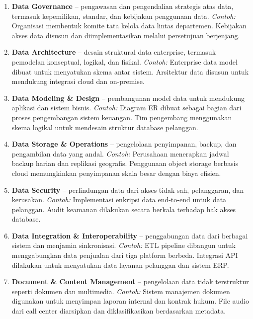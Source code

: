 \begin{enumerate}
	\item \textbf{Data Governance} – pengawasan dan pengendalian strategis atas data, termasuk kepemilikan, standar, dan kebijakan penggunaan data. \textit{Contoh:}  Organisasi membentuk komite tata kelola data lintas departemen. Kebijakan akses data disusun dan diimplementasikan melalui persetujuan berjenjang.
	
	\item \textbf{Data Architecture} – desain struktural data enterprise, termasuk pemodelan konseptual, logikal, dan fisikal. \textit{Contoh:}  Enterprise data model dibuat untuk menyatukan skema antar sistem. Arsitektur data disusun untuk mendukung integrasi cloud dan on-premise.
	
	\item \textbf{Data Modeling \& Design} – pembangunan model data untuk mendukung aplikasi dan sistem bisnis. \textit{Contoh:}  Diagram ER dibuat sebagai bagian dari proses pengembangan sistem keuangan. Tim pengembang menggunakan skema logikal untuk mendesain struktur database pelanggan.
	
	\item \textbf{Data Storage \& Operations} – pengelolaan penyimpanan, backup, dan pengambilan data yang andal. \textit{Contoh:}  Perusahaan menerapkan jadwal backup harian dan replikasi geografis. Penggunaan object storage berbasis cloud memungkinkan penyimpanan skala besar dengan biaya efisien.
	
	\item \textbf{Data Security} – perlindungan data dari akses tidak sah, pelanggaran, dan kerusakan. \textit{Contoh:}  Implementasi enkripsi data end-to-end untuk data pelanggan. Audit keamanan dilakukan secara berkala terhadap hak akses database.
	
	\item \textbf{Data Integration \& Interoperability} – penggabungan data dari berbagai sistem dan menjamin sinkronisasi. \textit{Contoh:}  ETL pipeline dibangun untuk menggabungkan data penjualan dari tiga platform berbeda. Integrasi API dilakukan untuk menyatukan data layanan pelanggan dan sistem ERP.
	
	\item \textbf{Document \& Content Management} – pengelolaan data tidak terstruktur seperti dokumen dan multimedia. \textit{Contoh:}  Sistem manajemen dokumen digunakan untuk menyimpan laporan internal dan kontrak hukum. File audio dari call center diarsipkan dan diklasifikasikan berdasarkan metadata.
	

\end{enumerate}
